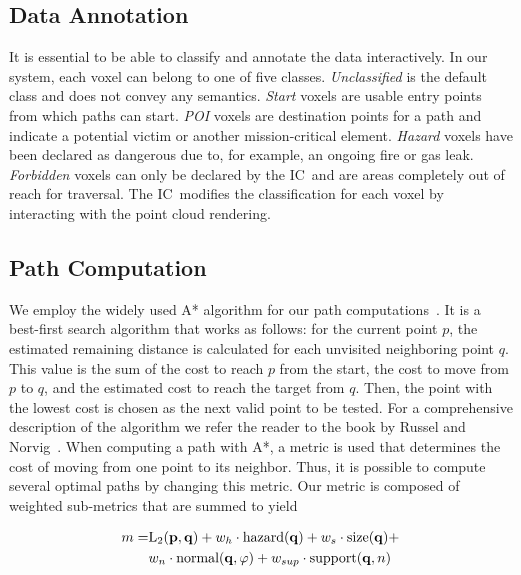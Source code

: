 \documentclass[conference,10pt,letter]{IEEEtran}
\def\IC{IC}
\begin{document}
\subsection{Data Annotation} \label{sec:overview:annotation}
It is essential to be able to classify and annotate the data interactively. In our system, each voxel can belong to one of five classes. \emph{Unclassified} is the default class and does not convey any semantics. \emph{Start} voxels are usable entry points from which paths can start. \emph{POI} voxels are destination points for a path and indicate a potential victim or another mission-critical element. \emph{Hazard} voxels have been declared as dangerous due to, for example, an ongoing fire or gas leak. \emph{Forbidden} voxels can only be declared by the \IC\ and are areas completely out of reach for traversal. The \IC\ modifies the classification for each voxel by interacting with the point cloud rendering.

\subsection{Path Computation} \label{sec:overview:pathcomputation}
We employ the widely used A* algorithm for our path computations~\cite{4082128}. It is a best-first search algorithm that works as follows: for the current point $p$, the estimated remaining distance is calculated for each unvisited neighboring point $q$. This value is the sum of the cost to reach $p$ from the start, the cost to move from $p$ to $q$, and the estimated cost to reach the target from $q$. Then, the point with the lowest cost is chosen as the next valid point to be tested. For a comprehensive description of the algorithm we refer the reader to the book by Russel and Norvig~\cite{AStar}. When computing a path with A*, a metric is used that determines the cost of moving from one point to its neighbor. Thus, it is possible to compute several optimal paths by changing this metric. Our metric is composed of weighted sub-metrics that are summed to yield

\begin{equation}
\begin{array}{r@{}l}
m = & \textrm{L}_2(\mathbf{p},\mathbf{q}) + w_h \cdot \textrm{hazard}(\mathbf{q}) + w_s \cdot \textrm{size}(\mathbf{q}) + \vspace*{0.1cm} \\
  & w_n \cdot \textrm{normal}(\mathbf{q},\varphi) + w_{sup} \cdot \textrm{support}(\mathbf{q},n)
\end{array}
\end{equation}
\end{document}
